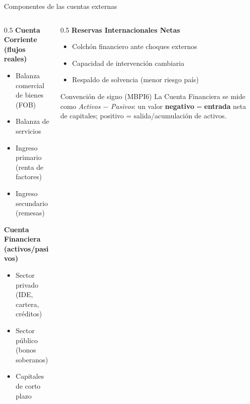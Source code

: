 \documentclass[10pt,aspectratio=169]{beamer}
\begin{document}
\begin{frame}{Componentes de las cuentas externas}
  \begin{columns}[T]
    \begin{column}{0.5\textwidth}
      \textbf{Cuenta Corriente (flujos reales)}
      \begin{itemize}\small
        \item Balanza comercial de bienes (FOB)
        \item Balanza de servicios
        \item Ingreso primario (renta de factores)
        \item Ingreso secundario (remesas)
      \end{itemize}
      \vspace{0.5em}
      \textbf{Cuenta Financiera (activos/pasivos)}
      \begin{itemize}\small
        \item Sector privado (IDE, cartera, créditos)
        \item Sector público (bonos soberanos)
        \item Capitales de corto plazo
      \end{itemize}
    \end{column}
    \begin{column}{0.5\textwidth}
      \textbf{Reservas Internacionales Netas}
      \begin{itemize}\small
        \item Colchón financiero ante choques externos
        \item Capacidad de intervención cambiaria
        \item Respaldo de solvencia (menor riesgo país)
      \end{itemize}
      \vspace{0.8em}
      \begin{alertblock}{Convención de signo (MBPI6)}
        \footnotesize La Cuenta Financiera se mide como \emph{Activos $-$ Pasivos}: un valor \textbf{negativo} = \textbf{entrada} neta de capitales; positivo = salida/acumulación de activos.
      \end{alertblock}
    \end{column}
  \end{columns}
\end{frame}
\end{document}
